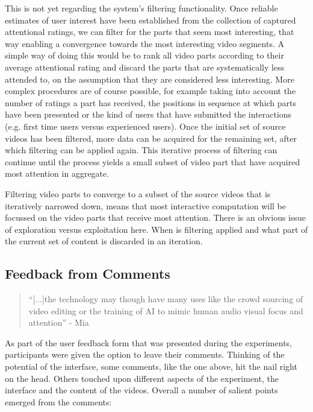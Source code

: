 This is not yet regarding the system's filtering functionality. Once reliable estimates of user interest have been established from the collection of captured attentional ratings, we can filter for the parts that seem most interesting, that way enabling a convergence towards the most interesting video segments. A simple way of doing this would be to rank all video parts according to their average attentional rating and discard the parts that are systematically less attended to, on the assumption that they are considered less interesting. More complex procedures are of course possible, for example taking into account the number of ratings a part has received, the positions in sequence at which parts have been presented or the kind of users that have submitted the interactions (e.g. first time users versus experienced users). Once the initial set of source videos has been filtered, more data can be acquired for the remaining set, after which filtering can be applied again. This iterative process of filtering can continue until the process yields a small subset of video part that have acquired most attention in aggregate.

Filtering video parts to converge to a subset of the source videos that is  iteratively narrowed down, means that most interactive computation will be focussed on the video parts that receive most attention. There is an obvious issue of exploration versus exploitation here. When is filtering applied and what part of the current set of content is discarded in an iteration.


\subsection{Feedback from Comments} %
\label{sub:feedback_from_comments}

\begin{quote}
  ``[...]the technology may though have many uses like the crowd sourcing of video editing or the training of AI to mimic human audio visual focus and attention'' - Mia
\end{quote}

As part of the user feedback form that was presented during the experiments, participants were given the option to leave their comments. Thinking of the potential of the interface, some comments, like the one above, hit the nail right on the head. Others touched upon different aspects of the experiment, the interface and the content of the videos. Overall a number of salient points emerged from the comments:

